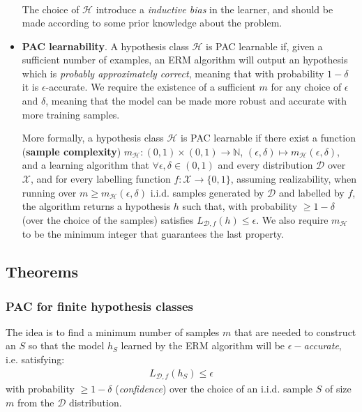\documentclass[../template.tex]{subfiles}
\begin{document}
\begin{itemize}
\begin{align*}
    \end{align*}    
    The choice of $\mathcal{H}$ introduce a \textit{inductive bias} in the learner, and should be made according to some prior knowledge about the problem. 
    \item \textbf{PAC learnability}. A hypothesis class $\mathcal{H}$ is PAC learnable if, given a sufficient number of examples, an ERM algorithm will output an hypothesis which is \textit{probably approximately correct}, meaning that with probability $1-\delta$ it is $\epsilon$-accurate. We require the existence of a sufficient $m$ for any choice of $\epsilon$ and $\delta$, meaning that the model can be made more robust and accurate with more training samples.

    \medskip

    More formally, a hypothesis class $\mathcal{H}$ is PAC learnable if there exist a function (\textbf{sample complexity}) $m_{\mathcal{H}} \colon (0,1) \times (0,1) \to \mathbb{N}$, $(\epsilon,\delta) \mapsto m_{\mathcal{H}}(\epsilon, \delta)$, and a learning algorithm that $\forall \epsilon, \delta \in (0,1)$ and every distribution $\mathcal{D}$ over $\mathcal{X}$, and for every labelling function $f\colon \mathcal{X} \to \{0,1\}$, assuming realizability, when running over $m \geq m_{\mathcal{H}}(\epsilon, \delta)$ i.i.d. samples generated by $\mathcal{D}$ and labelled by $f$, the algorithm returns a hypothesis $h$ such that, with probability $\geq 1-\delta$ (over the choice of the samples) satisfies $L_{\mathcal{D},f} (h) \leq \epsilon$. We also require $m_{\mathcal{H}}$ to be the minimum integer that guarantees the last property.


    

\end{itemize}


\subsection{Theorems}

\subsubsection{PAC for finite hypothesis classes}
The idea is to find a minimum number of samples $m$ that are needed to construct an $S$ so that the model $h_S$ learned by the ERM algorithm will be $\epsilon-$\textit{accurate}, i.e. satisfying:
\begin{align*}
    L_{\mathcal{D},f}(h_S) \leq \epsilon
\end{align*}
with probability $\geq 1-\delta$ (\textit{confidence}) over the choice of an i.i.d. sample $S$ of size $m$ from the $\mathcal{D}$ distribution.
\medskip
\end{document}
